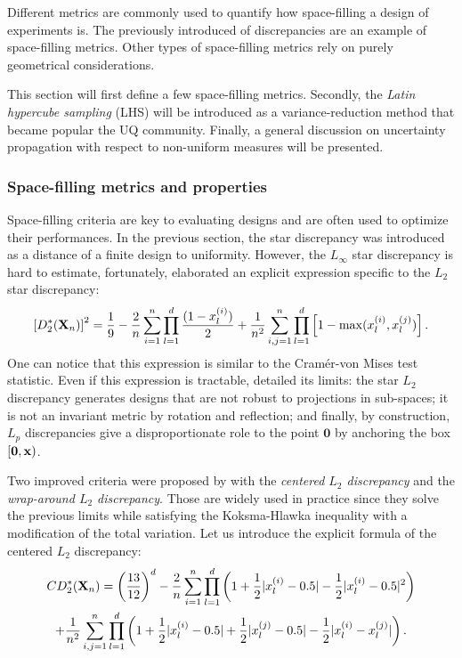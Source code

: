 Different metrics are commonly used to quantify how space-filling a design of experiments is. 
The previously introduced of discrepancies are an example of space-filling metrics. 
Other types of space-filling metrics rely on purely geometrical considerations.  

This section will first define a few space-filling metrics. 
Secondly, the \textit{Latin hypercube sampling} (LHS) will be introduced as a variance-reduction method that became popular the UQ community. 
Finally, a general discussion on uncertainty propagation with respect to non-uniform measures will be presented.

\subsubsection{Space-filling metrics and properties}
Space-filling criteria are key to evaluating designs and are often used to optimize their performances. 
In the previous section, the star discrepancy was introduced as a distance of a finite design to uniformity. 
However, the $L_\infty$ star discrepancy is hard to estimate, fortunately, \citet{warnock_1972} elaborated an explicit expression specific to the $L_2$ star discrepancy: 
\begin{equation}
    \left[D^*_2({\bf X}_n)\right]^2 = \frac19 - \frac2n \sum_{i=1}^{n} \prod_{l=1}^{d} \frac{(1-x_l^{(i)})}{2} + \frac{1}{n^2}\sum_{i,j=1}^{n} \prod_{l=1}^{d} \left[1 - \max(x_l^{(i)}, x_l^{(j)})\right].
\end{equation}
One can notice that this expression is similar to the Cramér-von Mises test statistic. 
Even if this expression is tractable, \citet{fang_liu_2018} detailed its limits: 
the star $L_2$ discrepancy generates designs that are not robust to projections in sub-spaces; 
it is not an invariant metric by rotation and reflection; 
and finally, by construction, $L_p$ discrepancies give a disproportionate role to the point $\mathbf{0}$ by anchoring the box $[\mathbf{0}, {\bf x})$.

Two improved criteria were proposed by \citet{hickernell_1998} with the \textit{centered $L_2$ discrepancy} and the \textit{wrap-around $L_2$ discrepancy}. 
Those are widely used in practice since they solve the previous limits while satisfying the Koksma-Hlawka inequality with a modification of the total variation. 
Let us introduce the explicit formula of the centered $L_2$ discrepancy:
\begin{multline} CD^*_2({\bf X}_n)  = \left(\frac{13}{12}\right)^{d} - \frac{2}{n} \sum_{i=1}^{n} \prod_{l=1}^{d} \left( 1 + \frac{1}{2} |x_l^{(i)} - 0.5| - \frac{1}{2} |x_l^{(i)} - 0.5|^2 \right)\\
    + \frac{1}{n^2} \sum_{i,j=1}^{n} \prod_{l=1}^{d} \left( 1 + \frac{1}{2} |x_l^{(i)} - 0.5| + \frac{1}{2} |x_l^{(j)} - 0.5| - \frac{1}{2} |x_l^{(i)} - x_l^{(j)}| \right).
\end{multline}

